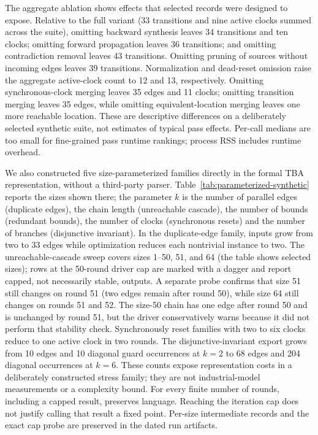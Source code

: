 The aggregate ablation shows effects that selected records were designed to
expose. Relative to the full variant (33 transitions and nine active clocks
summed across the suite), omitting backward synthesis leaves 34 transitions
and ten clocks; omitting forward propagation leaves 36 transitions; and
omitting contradiction removal leaves 43 transitions. Omitting pruning of
sources without incoming edges leaves 39 transitions. Normalization and
dead-reset omission raise the aggregate active-clock count to 12 and 13,
respectively. Omitting synchronous-clock merging leaves 35 edges and 11
clocks; omitting transition merging leaves 35 edges, while omitting
equivalent-location merging leaves one more reachable location. These are
descriptive differences on a deliberately selected synthetic suite, not
estimates of typical pass effects. Per-call medians are too small for
fine-grained pass runtime rankings; process RSS includes runtime overhead.


We also constructed five size-parameterized families directly in the formal
TBA representation, without a third-party parser. Table~\ref{tab:parameterized-synthetic}
reports the sizes shown there; the parameter $k$ is the number of parallel edges (duplicate edges), the chain length (unreachable cascade), the number of bounds (redundant bounds), the number of clocks (synchronous resets) and the number of branches (disjunctive invariant). In the duplicate-edge family, inputs grow from
two to 33 edges while optimization reduces each nontrivial instance to two.
The unreachable-cascade sweep covers sizes 1--50, 51, and 64 (the table shows selected sizes); rows at the
50-round driver cap are marked with a dagger and report capped, not necessarily stable,
outputs. A separate probe confirms that size 51 still changes on round 51
(two edges remain after round 50), while size 64 still changes on rounds 51
and 52. The size-50 chain has one edge after round 50 and is unchanged by
round 51, but the driver conservatively warns because it did not perform that
stability check. Synchronously reset families with two to six clocks reduce
to one active clock in two rounds.
The disjunctive-invariant export grows from 10 edges and 10 diagonal guard
occurrences at $k=2$ to 68 edges and 204 diagonal occurrences at $k=6$.
These counts expose representation costs in a deliberately constructed
stress family; they are not industrial-model measurements or a complexity
bound. For every finite number of rounds, including a capped result,
 preserves language. Reaching the iteration cap
does not justify calling that result a fixed point. Per-size intermediate
records and the exact cap probe are preserved in the dated run artifacts.




